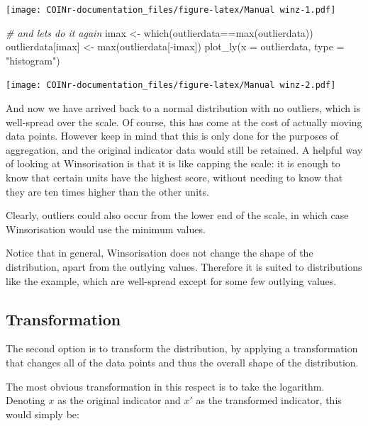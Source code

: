 \documentclass[
]{book}
\newenvironment{Shaded}{\begin{snugshade}}{\end{snugshade}}
\newcommand{\AttributeTok}[1]{\textcolor[rgb]{0.77,0.63,0.00}{#1}}
\newcommand{\CommentTok}[1]{\textcolor[rgb]{0.56,0.35,0.01}{\textit{#1}}}
\newcommand{\FunctionTok}[1]{\textcolor[rgb]{0.00,0.00,0.00}{#1}}
\newcommand{\NormalTok}[1]{#1}
\newcommand{\OtherTok}[1]{\textcolor[rgb]{0.56,0.35,0.01}{#1}}
\newcommand{\SpecialCharTok}[1]{\textcolor[rgb]{0.00,0.00,0.00}{#1}}
\newcommand{\StringTok}[1]{\textcolor[rgb]{0.31,0.60,0.02}{#1}}
\begin{document}
\texttt{[image: COINr-documentation\_files/figure-latex/Manual winz-1.pdf]}

\begin{Shaded}
\begin{Highlighting}[]

\CommentTok{\# and let\textquotesingle{}s do it again}
\NormalTok{imax }\OtherTok{\textless{}{-}} \FunctionTok{which}\NormalTok{(outlierdata}\SpecialCharTok{==}\FunctionTok{max}\NormalTok{(outlierdata))}
\NormalTok{outlierdata[imax] }\OtherTok{\textless{}{-}} \FunctionTok{max}\NormalTok{(outlierdata[}\SpecialCharTok{{-}}\NormalTok{imax])}
\FunctionTok{plot\_ly}\NormalTok{(}\AttributeTok{x =}\NormalTok{ outlierdata, }\AttributeTok{type =} \StringTok{"histogram"}\NormalTok{)}
\end{Highlighting}
\end{Shaded}

\texttt{[image: COINr-documentation\_files/figure-latex/Manual winz-2.pdf]}

And now we have arrived back to a normal distribution with no outliers, which is well-spread over the scale. Of course, this has come at the cost of actually moving data points. However keep in mind that this is only done for the purposes of aggregation, and the original indicator data would still be retained. A helpful way of looking at Winsorisation is that it is like capping the scale: it is enough to know that certain units have the highest score, without needing to know that they are ten times higher than the other units.

Clearly, outliers could also occur from the lower end of the scale, in which case Winsorisation would use the minimum values.

Notice that in general, Winsorisation does not change the shape of the distribution, apart from the outlying values. Therefore it is suited to distributions like the example, which are well-spread except for some few outlying values.

\hypertarget{transformation}{%
\subsection{Transformation}\label{transformation}}

The second option is to transform the distribution, by applying a transformation that changes all of the data points and thus the overall shape of the distribution.

The most obvious transformation in this respect is to take the logarithm. Denoting \(x\) as the original indicator and \(x'\) as the transformed indicator, this would simply be:
\end{document}

